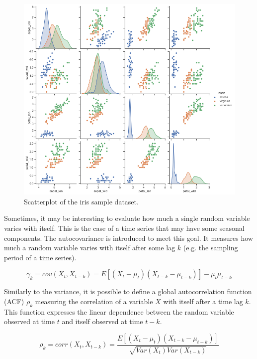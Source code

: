 \begin{figure}[hbt!]
\centering
\includegraphics[width=1\textwidth]{SectionLetsMath/elemStat_figures/fig_irisCorrelation.png}
\captionsetup{type=figure}
\caption{Scatterplot of the iris sample dataset.}
\label{fig_irisCorrelation}
\end{figure}

Sometimes, it may be interesting to evaluate how much a single random variable varies with itself. This is the case of a time series that may have some seasonal components. The autocovariance is introduced to meet this goal. It measures how much a random variable varies with itself after some lag $k$ (e.g. the sampling period of a time series).

\begin{equation}
\gamma_k=cov\left(X_t,X_{t-k}\right)=E\left[\left(X_t-\mu_t\right)\left(X_{t-k}-\mu_{t-k}\right)\right]-\mu_t\mu_{t-k}
\label{eq_autocovariance}
\end{equation}

Similarly to the variance, it is possible to define a global autocorrelation function (ACF) $\rho_k$ measuring the correlation of a variable $X$ with itself after a time lag $k$. This function expresses the linear dependence between the random variable observed at time $t$ and itself observed at time $t-k$.

\begin{equation}
\rho_k=corr\left(X_t,X_{t-k}\right)=\frac{E[(X_t-\mu_t)(X_{t-k}-\mu_{t-k})]}{\sqrt{Var(X_t)Var(X_{t-k})}}
\label{eq_ACF}
\end{equation}

